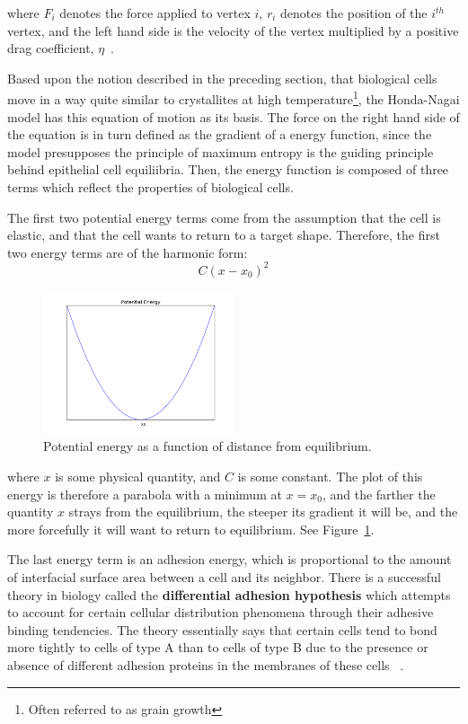 where $F_i$ denotes the force applied to vertex $i$, $r_i$ denotes the position of the $i^{th}$ vertex,  and the left hand side is the velocity of the vertex multiplied by a positive drag coefficient, $\eta$~\cite{1989Kawasaki}.

Based upon the notion described in the preceding section, that biological cells move in a way quite similar to crystallites at high temperature\footnote{Often referred to as grain growth}, the Honda-Nagai model has this equation of motion as its basis. The force on the right hand side of the equation is in turn defined as the gradient of a energy function, since the model presupposes the principle of maximum entropy is the guiding principle behind epithelial cell equiliibria. Then, the energy function is composed of three terms which reflect the properties of biological cells.

The first two potential energy terms come from the assumption that the cell is elastic, and that the cell wants to return to a target shape. Therefore, the first two energy terms are of the harmonic form: 
\begin{equation}
C(x-x_0)^2
\end{equation}
\begin{figure}
\centering
\includegraphics[width=0.5\textwidth]{../diagrams/parabola.png}
\caption{Potential energy as a function of distance from equilibrium.}
\label{fig:pe}
\end{figure}
where $x$ is some physical quantity, and $C$ is some constant. The plot of this energy is therefore a parabola with a minimum at $x =  x_0$, and the farther the quantity $x$ strays from the equilibrium, the steeper its gradient it will be, and the more forcefully it will want to return to equilibrium. See Figure~\ref{fig:pe}.

The last energy term is an adhesion energy, which is proportional to the amount of interfacial surface area between a cell and its neighbor. There is a successful theory in biology called the \textbf{differential adhesion hypothesis} which attempts to account for certain cellular distribution phenomena through their adhesive binding tendencies. The theory essentially says that certain cells tend to bond more tightly to cells of type A than to cells of type B due to the presence or absence of different adhesion proteins in the membranes of these cells  ~\cite{DA}.

